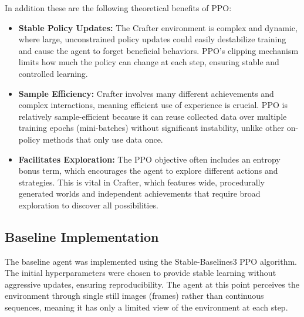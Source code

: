 \documentclass[twocolumn]{article}
\begin{document}
In addition these are the following theoretical benefits of PPO:
\begin{itemize}
    \item \textbf{Stable Policy Updates:} The Crafter environment is complex and dynamic, where large, unconstrained policy updates could easily destabilize training and cause the agent to forget beneficial behaviors. PPO's clipping mechanism limits how much the policy can change at each step, ensuring stable and controlled learning.
    \item \textbf{Sample Efficiency:} Crafter involves many different achievements and complex interactions, meaning efficient use of experience is crucial. PPO is relatively sample-efficient because it can reuse collected data over multiple training epochs (mini-batches) without significant instability, unlike other on-policy methods that only use data once.
    \item \textbf{Facilitates Exploration:} The PPO objective often includes an entropy bonus term, which encourages the agent to explore different actions and strategies. This is vital in Crafter, which features wide, procedurally generated worlds and independent achievements that require broad exploration to discover all possibilities.
\end{itemize}

\subsection*{Baseline Implementation}
The baseline agent was implemented using the Stable-Baselines3 PPO algorithm. The initial hyperparameters were chosen to provide stable learning without aggressive updates, ensuring reproducibility. The agent at this point perceives the environment through single still images (frames) rather than continuous sequences, meaning it has only a limited view of the environment at each step.
\end{document}
